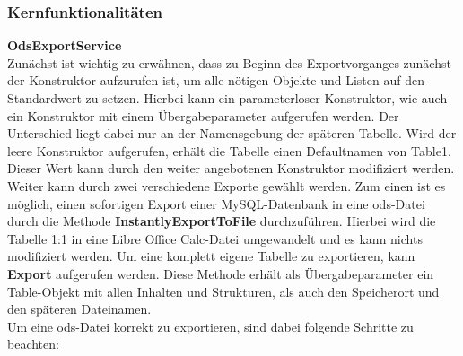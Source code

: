 \subsubsection{Kernfunktionalitäten}
\label{loCore}
\textbf{OdsExportService}\\
Zunächst ist wichtig zu erwähnen, dass zu Beginn des Exportvorganges zunächst der Konstruktor aufzurufen ist, um alle nötigen Objekte und Listen auf den Standardwert zu setzen. Hierbei kann ein parameterloser Konstruktor, wie auch ein Konstruktor mit einem Übergabeparameter aufgerufen werden. Der Unterschied liegt dabei nur an der Namensgebung der späteren Tabelle. Wird der leere Konstruktor aufgerufen, erhält die Tabelle einen Defaultnamen von {\frqq}Table1{\flqq}. Dieser Wert kann durch den weiter angebotenen Konstruktor modifiziert werden.\\
Weiter kann durch zwei verschiedene Exporte gewählt werden. Zum einen ist es möglich, einen sofortigen Export einer MySQL-Datenbank in eine ods-Datei durch die Methode \textbf{InstantlyExportToFile} durchzuführen. Hierbei wird die Tabelle 1:1 in eine Libre Office Calc-Datei umgewandelt und es kann nichts modifiziert werden. Um eine komplett eigene Tabelle zu exportieren, kann \textbf{Export} aufgerufen werden. Diese Methode erhält als Übergabeparameter ein Table-Objekt mit allen Inhalten und Strukturen, als auch den Speicherort und den späteren Dateinamen.\\
Um eine ods-Datei korrekt zu exportieren, sind dabei folgende Schritte zu beachten:
